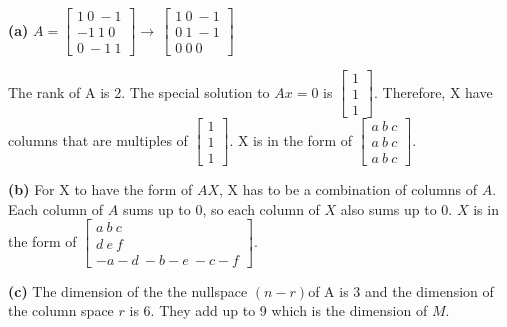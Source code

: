 \documentclass[11pt]{article}
\renewcommand\part[1]{\vspace{.10in}\textbf{(#1)}}
\begin{document}
\part{a}
\(A = \begin{bmatrix} 1 \ 0 \ -1 \\ -1 \ 1 \ 0 \\ 0 \ -1 \ 1 \end{bmatrix}\to\,\begin{bmatrix} 1 \ 0 \ -1 \\ 0 \ 1 \ -1 \\ 0 \ 0 \ 0 \end{bmatrix}\)

The rank of A is 2. The special solution to \(Ax = 0\) is \(\begin{bmatrix} 1 \\ 1 \\ 1 \end{bmatrix}\). Therefore, X have columns that are multiples of \(\begin{bmatrix} 1 \\ 1 \\ 1 \end{bmatrix}\). X is in the form of \(\begin{bmatrix} a \ b \ c \\ a \ b \ c \\ a \ b \ c \end{bmatrix}\).

\part{b}
For X to have the form of \(AX\), X has to be a combination of columns of \(A\). Each column of \(A\) sums up to 0, so each column of \(X\) also sums up to 0. \(X\) is in the form of \(\begin{bmatrix} a \ b \ c \\ d \ e \ f \\ -a-d \ -b-e \ -c-f \end{bmatrix}\).

\part{c}
The dimension of the the nullspace \((n - r)\)of A is 3 and the dimension of the column space \(r\) is 6. They add up to 9 which is the dimension of \(M\). 
\end{document}
